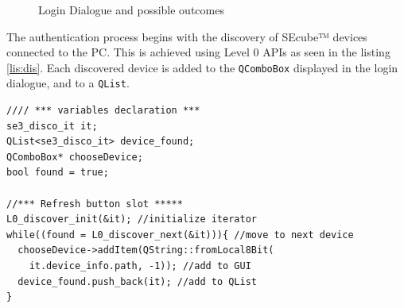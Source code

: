 \begin{figure}[ht]
  \centering
  {}
  {}
  \caption{Login Dialogue and possible outcomes}
 \label{fig:login}
\end{figure}

The authentication process begins with the discovery of SEcube™ devices connected to the PC. This is achieved using Level 0 APIs as seen in the listing \ref{lis:dis}. Each discovered device is added to the \texttt{QComboBox} displayed in the login dialogue, and to a \texttt{QList}.

\begin{lstlisting}[style=customc, float=htb, caption={Connected Devices discovery}, label = {lis:dis}]
//// *** variables declaration ***
se3_disco_it it;
QList<se3_disco_it> device_found;
QComboBox* chooseDevice;
bool found = true;

//*** Refresh button slot *****
L0_discover_init(&it); //initialize iterator
while((found = L0_discover_next(&it))){ //move to next device
  chooseDevice->addItem(QString::fromLocal8Bit(
    it.device_info.path, -1)); //add to GUI
  device_found.push_back(it); //add to QList
}
\end{lstlisting}

